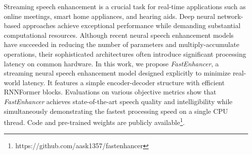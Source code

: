 

Streaming speech enhancement is a crucial task for real-time applications such as online meetings, smart home appliances, and hearing aids. Deep neural network-based approaches achieve exceptional performance while demanding substantial computational resources. Although recent neural speech enhancement models have succeeded in reducing the number of parameters and multiply-accumulate operations, their sophisticated architectures often introduce significant processing latency on common hardware. In this work, we propose \textit{FastEnhancer}, a streaming neural speech enhancement model designed explicitly to minimize real-world latency. It features a simple encoder-decoder structure with efficient RNNFormer blocks. Evaluations on various objective metrics show that \textit{FastEnhancer} achieves state-of-the-art speech quality and intelligibility while simultaneously demonstrating the fastest processing speed on a single CPU thread. Code and pre-trained weights are publicly available\footnote{https://github.com/aask1357/fastenhancer}.